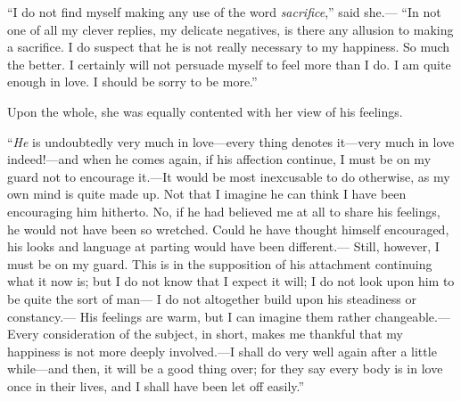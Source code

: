 ``I do not find myself making any use of the word \emph{sacrifice},'' said she.---%
``In not one of all my clever replies, my delicate negatives,
is there any allusion to making a sacrifice.  I do suspect that he
is not really necessary to my happiness.  So much the better.
I certainly will not persuade myself to feel more than I do.  I am
quite enough in love.  I should be sorry to be more.''

Upon the whole, she was equally contented with her view of his feelings.

``\emph{He} is undoubtedly very much in love---every thing denotes it---very much
in love indeed!---and when he comes again, if his affection continue,
I must be on my guard not to encourage it.---It would be most
inexcusable to do otherwise, as my own mind is quite made up.
Not that I imagine he can think I have been encouraging him hitherto.
No, if he had believed me at all to share his feelings, he would
not have been so wretched.  Could he have thought himself encouraged,
his looks and language at parting would have been different.---%
Still, however, I must be on my guard.  This is in the supposition
of his attachment continuing what it now is; but I do not know that I
expect it will; I do not look upon him to be quite the sort of man---%
I do not altogether build upon his steadiness or constancy.---%
His feelings are warm, but I can imagine them rather changeable.---%
Every consideration of the subject, in short, makes me thankful
that my happiness is not more deeply involved.---I shall do very well
again after a little while---and then, it will be a good thing over;
for they say every body is in love once in their lives, and I shall
have been let off easily.''

